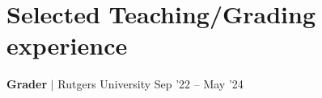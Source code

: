\section{Selected Teaching/Grading experience}
\resumeSubHeadingListStart





\resumeProjectHeading
{\textbf{Grader} $|$ Rutgers University}
{Sep '22 -- May '24}
\vspace{-20pt}


